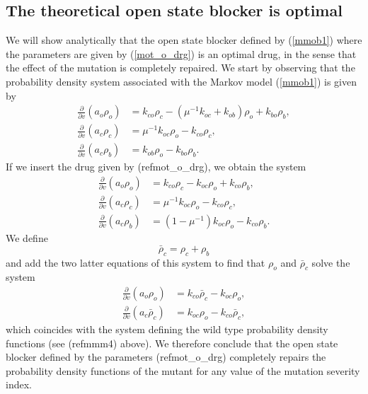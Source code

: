 \subsection{The theoretical open state blocker is optimal}
We will show analytically that the open state blocker defined by (\ref{mmob1}) where the parameters are given by
(\ref{mot_o_drg}) is an optimal drug, in the sense that the effect of the mutation is completely repaired.
We start by observing that the probability density system associated with the Markov model  (\ref{mmob1}) is given by
\begin{align}
\frac{\partial}{\partial v}\left(  a_{o}\rho_{o}\right)   &  =k_{co}\rho
_{c}-(\mu^{-1}k_{oc}+k_{ob})\rho_{o}+k_{bo}\rho_{b},\nonumber\\
\frac{\partial}{\partial v}\left(  a_{c}\rho_{c}\right)   &  =\mu^{-1}
k_{oc}\rho_{o}-k_{co}\rho_{c},\label{mm_dr_3}\\
\frac{\partial}{\partial v}\left(  a_{c}\rho_{b}\right)   &  =k_{ob}\rho
_{o}-k_{bo}\rho_{b}.\nonumber
\end{align}
If we insert the drug given by (ref{mot_o_drg}), we obtain the
system
\begin{align}
\frac{\partial}{\partial v}\left(  a_{o}\rho_{o}\right)   &  =k_{co}\rho
_{c}-k_{oc}\rho_{o}+k_{co}\rho_{b},\nonumber\\
\frac{\partial}{\partial v}\left(  a_{c}\rho_{c}\right)   &  =\mu^{-1}
k_{oc}\rho_{o}-k_{co}\rho_{c},\label{mm_dr_o2}\\
\frac{\partial}{\partial v}\left(  a_{c}\rho_{b}\right)   &  =\left(
1-\mu^{-1}\right)  k_{oc}\rho_{o}-k_{co}\rho_{b}.\nonumber
\end{align}
We define
\[
\bar{\rho}_{c}=\rho_{c}+\rho_{b}
\]
and add the two latter equations of this system to find that $\rho_{o}$ and 
$\bar{\rho}_{c}$ solve the system
\begin{align}
\frac{\partial}{\partial v}\left(  a_{o}\rho_{o}\right)   &  =k_{co}\bar{\rho
}_{c}-k_{oc}\rho_{o},\\
\frac{\partial}{\partial v}\left(  a_{c}\bar{\rho}_{c}\right)   &  =k_{oc}
\rho_{o}-k_{co}\bar{\rho}_{c},\nonumber
\end{align}
which coincides with the system defining the wild type probability density
functions (see (ref{mmm4}) above). We therefore conclude that
the open state blocker defined by the parameters 
(ref{mot_o_drg})
completely repairs the probability density functions of the mutant for any
value of the mutation severity index.

